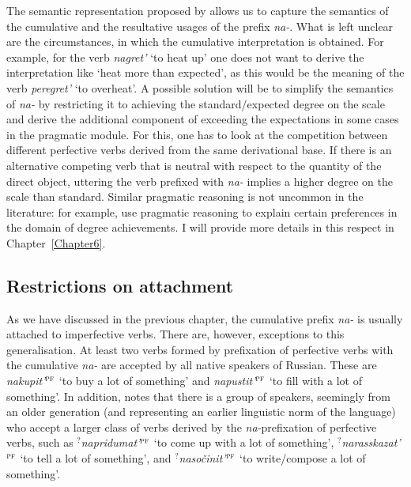 The semantic representation proposed by \citet{Kagan:book} allows us to capture the semantics of the cumulative and the resultative usages of the prefix \textit{na-}. What is left unclear are the circumstances, in which the cumulative interpretation is obtained. For example, for the verb \textit{nagret'} `to heat up' one does not want to derive the interpretation like `heat more than expected', as this would be the meaning of the verb \textit{peregret'} `to overheat'. A possible solution will be to simplify the semantics of \textit{na-} by restricting it to achieving the standard/expected degree on the scale and derive the additional component of exceeding the expectations in some cases in the pragmatic module. For this, one has to look at the competition between different perfective verbs derived from the same derivational base. If there is an alternative competing verb that is neutral with respect to the quantity of the direct object, uttering the verb prefixed with \textit{na-} implies a higher degree on the scale than standard. Similar pragmatic reasoning is not uncommon in the literature: for example, \citet[21]{KennedyLevin:08} use pragmatic reasoning to explain certain preferences in the domain of degree achievements. I will provide more details in this respect in Chapter~\ref{Chapter6}.

\subsection{Restrictions on attachment}
As we have discussed in the previous chapter, the cumulative prefix \textit{na-} is usually attached to imperfective verbs. There are, however, exceptions to this generalisation. At least two verbs formed by prefixation of perfective verbs with the cumulative \textit{na-} are accepted by all native speakers of Russian. These are \textit{nakupit'}$^{\textsc{pf}}$ `to buy a lot of something' and \textit{napustit'}$^{\textsc{pf}}$ `to fill with a lot of something'. In addition, \citet{Tatevosov:13a} notes that there is a group of speakers, seemingly from an older generation (and representing an earlier linguistic norm of the language) who accept a larger class of verbs derived by the \textit{na-}prefixation of perfective verbs, such as \textit{$^?$napridumat'}$^{\textsc{pf}}$ `to come up with a lot of something', \textit{$^?$narasskazat'}$^{\textsc{pf}}$ `to tell a lot of something', and \textit{$^?$naso\v{c}init'}$^{\textsc{pf}}$ `to write/compose a lot of something'.


